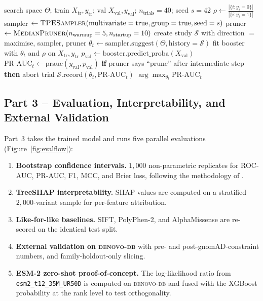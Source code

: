 \documentclass[11pt,a4paper,oneside]{report}
\begin{document}
\begin{algorithm}[htbp]
\caption{Optuna TPE hyperparameter search}
\label{alg:tpe}
\begin{algorithmic}[1]
\Require search space $\Theta$; train $X_{\text{tr}}, y_{\text{tr}}$; val $X_{\text{val}}, y_{\text{val}}$; $n_{\text{trials}}=40$; seed $s=42$
\State $\rho \gets \tfrac{|\{i : y_i = 0\}|}{|\{i : y_i = 1\}|}$ 
\State sampler $\gets \textsc{TPESampler}(\text{multivariate}=\text{true}, \text{group}=\text{true}, \text{seed}=s)$
\State pruner $\gets \textsc{MedianPruner}(n_{\text{warmup}}=5, n_{\text{startup}}=10)$
\State create study $\mathcal{S}$ with direction $=$ maximise, sampler, pruner
  \State $\theta_t \gets \text{sampler.suggest}(\Theta, \text{history}=\mathcal{S})$
  \State fit booster with $\theta_t$ and $\rho$ on $X_{\text{tr}}, y_{\text{tr}}$
  \State $p_{\text{val}} \gets \text{booster.predict\_proba}(X_{\text{val}})$
  \State $\text{PR-AUC}_t \gets \text{prauc}(y_{\text{val}}, p_{\text{val}})$
  \State \textbf{if} pruner says ``prune'' after intermediate step \textbf{then} abort trial
  \State $\mathcal{S}.\text{record}(\theta_t, \text{PR-AUC}_t)$
\EndFor
\State \Return $\arg\max_{\theta_t} \text{PR-AUC}_t$
\end{algorithmic}
\end{algorithm}

\subsection{Part 3 -- Evaluation, Interpretability, and External Validation}
\label{sec:fw-part3}

Part~3 takes the trained model and runs five parallel
evaluations (Figure~\ref{fig:evalflow}):

\begin{enumerate}
\item \textbf{Bootstrap confidence intervals.} $1{,}000$
non-parametric replicates for ROC-AUC, PR-AUC, F1, MCC,
and Brier loss, following the methodology of
\citet{efron1986bootstrap}.
\item \textbf{TreeSHAP interpretability.} SHAP values
\citep{lundberg2017shap, lundberg2020treeshap} are
computed on a stratified $2{,}000$-variant sample for
per-feature attribution.
\item \textbf{Like-for-like baselines.} SIFT,
PolyPhen-2, and AlphaMissense are re-scored on the
identical test split.
\item \textbf{External validation on \textsc{denovo-db}}
with pre- and post-gnomAD-constraint numbers, and
family-holdout-only slicing.
\item \textbf{ESM-2 zero-shot proof-of-concept.} The
log-likelihood ratio from \texttt{esm2\_t12\_35M\_UR50D}
is computed on \textsc{denovo-db} and fused with the
XGBoost probability at the rank level to test
orthogonality.
\end{enumerate}
\end{document}
